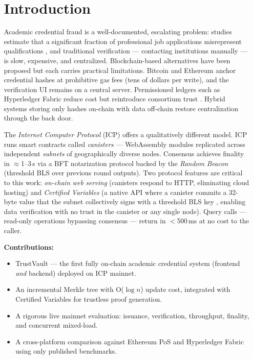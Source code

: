 \documentclass[conference]{IEEEtran}
\begin{document}
\section{Introduction}
\label{sec:intro}

Academic credential fraud is a well-documented, escalating problem: studies estimate that a significant fraction of professional job applications misrepresent qualifications \cite{chahal2021credential}, and traditional verification — contacting institutions manually — is slow, expensive, and centralized. Blockchain-based alternatives have been proposed but each carries practical limitations. Bitcoin and Ethereum anchor credential hashes at prohibitive gas fees (tens of dollars per write), and the verification UI remains on a central server. Permissioned ledgers such as Hyperledger Fabric reduce cost but reintroduce consortium trust \cite{androulaki2018fabric}. Hybrid systems storing only hashes on-chain with data off-chain restore centralization through the back door.

The \textit{Internet Computer Protocol} (ICP) \cite{hanke2018dfinity} offers a qualitatively different model. ICP runs smart contracts called \textit{canisters} — WebAssembly modules replicated across independent \textit{subnets} of geographically diverse nodes. Consensus achieves finality in $\approx$1--3\,s via a BFT notarization protocol backed by the \textit{Random Beacon} (threshold BLS over previous round outputs). Two protocol features are critical to this work: \textit{on-chain web serving} (canisters respond to HTTP, eliminating cloud hosting) and \textit{Certified Variables} (a native API where a canister commits a 32-byte value that the subnet collectively signs with a threshold BLS key \cite{dfinity2022geeks}, enabling data verification with no trust in the canister or any single node). Query calls — read-only operations bypassing consensus — return in $<$500\,ms at no cost to the caller.

\textbf{Contributions:}
\begin{itemize}
  \item TrustVault — the first fully on-chain academic credential system (frontend \emph{and} backend) deployed on ICP mainnet.
  \item An incremental Merkle tree with O($\log n$) update cost, integrated with Certified Variables for trustless proof generation.
  \item A rigorous live mainnet evaluation: issuance, verification, throughput, finality, and concurrent mixed-load.
  \item A cross-platform comparison against Ethereum PoS \cite{buterin2020eth2} and Hyperledger Fabric \cite{androulaki2018fabric} using only published benchmarks.
\end{itemize}
\end{document}
